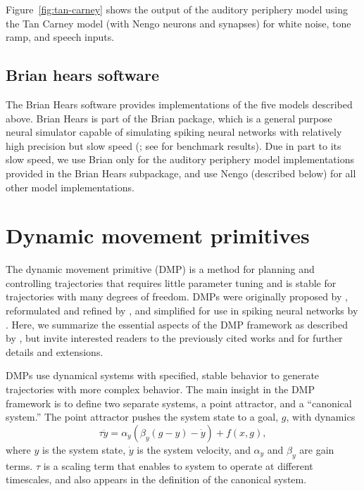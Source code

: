 Figure~\ref{fig:tan-carney} shows the output
of the auditory periphery model
using the Tan Carney model
(with Nengo neurons and synapses)
for white noise, tone ramp, and speech inputs.


\subsection{Brian hears software}
\label{sec:brian-hears}

The Brian Hears software
\citep{fontaine2011}
provides implementations
of the five models described above.
Brian Hears is part of the
Brian package,
which is a general purpose
neural simulator capable
of simulating spiking neural networks
with relatively high precision
but slow speed
(\citealp{goodman2008};
see \citealt{bekolay2013} for benchmark results).
Due in part to its slow speed,
we use Brian only for
the auditory periphery model implementations
provided in the Brian Hears subpackage,
and use Nengo (described below)
for all other model implementations.

\section{Dynamic movement primitives}
\label{sec:methods-dmp}

The dynamic movement primitive (DMP)
is a method for planning and controlling trajectories
that requires little parameter tuning
and is stable for trajectories
with many degrees of freedom.
DMPs were originally proposed
by \citet{schaal2005,schaal2006},
reformulated and refined by \citet{ijspeert2007},
and simplified for use in spiking neural networks
by \citet{dewolf2015}.
Here, we summarize the essential aspects
of the DMP framework as described by \citet{dewolf2015},
but invite interested readers to
the previously cited works
and \citet{vijayakumar2005,ijspeert2013}
for further details and extensions.

DMPs use dynamical systems
with specified, stable behavior
to generate trajectories
with more complex behavior.
The main insight in the DMP framework
is to define two separate systems,
a point attractor,
and a ``canonical system.''
The point attractor pushes
the system state to
a goal, $g$, with dynamics
\begin{equation} \label{dmp-pointattractor}
  \tau\ddot{y} = \alpha_y(\beta_y(g - y) - \dot{y}) + f(x, g),
\end{equation}
where $y$ is the system state,
$\dot{y}$ is the system velocity,
and $\alpha_y$ and $\beta_y$ are gain terms.
$\tau$ is a scaling term
that enables to system to operate
at different timescales,
and also appears in the definition
of the canonical system.

